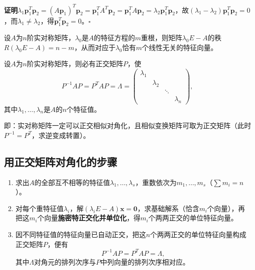 \textbf{证明}\quad $\lambda_1\boldsymbol{p}_1^{T}\boldsymbol{p}_2=(A\boldsymbol{p}_1)^{T}\boldsymbol{p}_2=\boldsymbol{p}_1^{T}A^{T}\boldsymbol{p}_2=\boldsymbol{p}_1^{T}A\boldsymbol{p}_2=\lambda_2\boldsymbol{p}_1^{T}\boldsymbol{p}_2$，故$(\lambda_1-\lambda_2)\boldsymbol{p}_1^{T}\boldsymbol{p}_2=0$，而$\lambda_1\ne\lambda_2$，得$\boldsymbol{p}_1^{T}\boldsymbol{p}_2=0$。\hfill$\square$

\begin{theorem}[性质3：重根的几何重数等于代数重数]
设$A$为$n$阶实对称矩阵，$\lambda_0$是$A$的特征方程的$m$重根，则矩阵$\lambda_0E-A$的秩$R(\lambda_0E-A)=n-m$，从而对应于$\lambda_0$恰有$m$个线性无关的特征向量。
\end{theorem}

\begin{theorem}[实对称矩阵的正交对角化]
设$A$为$n$阶实对称矩阵，则必有正交矩阵$P$，使
\[
P^{-1}AP=P^{T}AP=\Lambda=
\begin{pmatrix}\lambda_1&&&\\&\lambda_2&&\\&&\ddots&\\&&&\lambda_n\end{pmatrix},
\]
其中$\lambda_1,\dots,\lambda_n$是$A$的$n$个特征值。
\end{theorem}

即：实对称矩阵一定可以正交相似对角化，且相似变换矩阵可取为正交矩阵（此时$P^{-1}=P^{T}$，求逆变成转置）。

\subsection{用正交矩阵对角化的步骤}
\begin{enumerate}
    \item 求出$A$的全部互不相等的特征值$\lambda_1,\dots,\lambda_s$，重数依次为$m_1,\dots,m_s$（$\sum m_i=n$）。
    \item 对每个重特征值$\lambda_i$，解$(\lambda_iE-A)\boldsymbol{x}=\boldsymbol{0}$，求基础解系（恰含$m_i$个向量），再把这$m_i$个向量\textbf{施密特正交化并单位化}，得$m_i$个两两正交的单位特征向量。
    \item 因不同特征值的特征向量已自动正交，把这$n$个两两正交的单位特征向量构成正交矩阵$P$，便有
    \[
    P^{-1}AP=P^{T}AP=\Lambda,
    \]
    其中$\Lambda$对角元的排列次序与$P$中列向量的排列次序相对应。
\end{enumerate}



